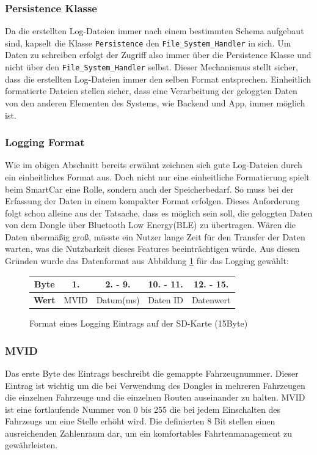 \subsubsection*{Persistence Klasse}
Da die erstellten Log-Dateien immer nach einem bestimmten Schema aufgebaut sind, kapselt die Klasse \texttt{Persistence} den \texttt{File\_System\_Handler} in sich. Um Daten zu schreiben erfolgt der Zugriff also immer über die Persistence Klasse und nicht über den \texttt{File\_System\_Handler} selbst. Dieser Mechanismus stellt sicher, dass die erstellten Log-Dateien immer den selben Format entsprechen. Einheitlich formatierte Dateien stellen sicher, dass eine Verarbeitung der geloggten Daten von den anderen Elementen des Systems, wie Backend und App, immer möglich ist.
\subsubsection*{Logging Format}
Wie im obigen Abschnitt bereits erwähnt zeichnen sich gute Log-Dateien durch ein einheitliches Format aus. Doch nicht nur eine einheitliche Formatierung spielt beim SmartCar eine Rolle, sondern auch der Speicherbedarf. So muss bei der Erfassung der Daten in einem kompakter Format erfolgen. Dieses Anforderung folgt schon alleine aus der Tatsache, dass es möglich sein soll, die geloggten Daten von dem Dongle über Bluetooth Low Energy(BLE) zu übertragen. Wären die Daten übermäßig groß, müsste ein Nutzer lange Zeit für den Transfer der Daten warten, was die Nutzbarkeit dieses Features beeinträchtigen würde. Aus diesen Gründen wurde das Datenformat aus Abbildung \ref{fig:LoggingEntry} für das Logging gewählt:
\begin{figure}[H]
\begin{center}
  \begin{tabular}{ | c || c | c | c | c |}
    \hline
    \textbf{Byte} & 1. & 2. - 9. & 10. - 11. & 12. - 15. \\ \hline
    \textbf{Wert} & MVID & Datum(ms) & Daten ID & Datenwert \\
    \hline
  \end{tabular}
  \caption{Format eines Logging Eintrags auf der SD-Karte (15Byte)}
  \label{fig:LoggingEntry}
\end{center}
\end{figure}
\subsubsection*{MVID}
Das erste Byte des Eintrags beschreibt die gemappte Fahrzeugnummer. Dieser Eintrag ist wichtig um die bei Verwendung des Dongles in mehreren Fahrzeugen die einzelnen Fahrzeuge und die einzelnen Routen auseinander zu halten. MVID ist eine fortlaufende Nummer von 0 bis 255 die bei jedem Einschalten des Fahrzeugs um eine Stelle erhöht wird. Die definierten 8 Bit stellen einen ausreichenden Zahlenraum dar, um ein komfortables Fahrtenmanagement zu gewährleisten. 
